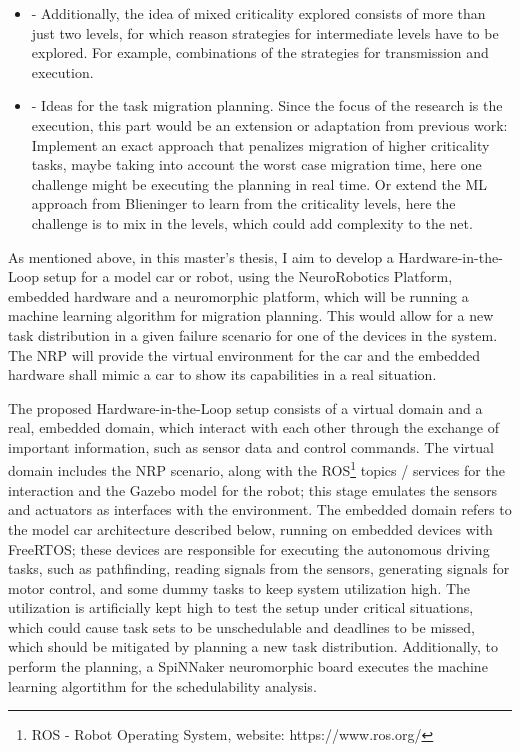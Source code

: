 \begin{itemize}
\item - Additionally, the idea of mixed criticality explored consists of more than just two levels, for which reason strategies for intermediate levels have to be explored. For example, combinations of the strategies for transmission and execution. 
\item - Ideas for the task migration planning. Since the focus of the research is the execution, this part would be an extension or adaptation from previous work: Implement an exact approach that penalizes migration of higher criticality tasks, maybe taking into account the worst case migration time, here one challenge might be executing the planning in real time. Or extend the ML approach from Blieninger to learn from the criticality levels, here the challenge is to mix in the levels, which could add complexity to the net.
\end{itemize}



As mentioned above, in this master’s thesis, I aim to develop a Hardware-in-the-Loop setup for a model car or robot, using the NeuroRobotics Platform, embedded hardware and a neuromorphic platform, which will be running a machine learning algorithm for migration planning. This would allow for a new task distribution in a given failure scenario for one of the devices in the system. The NRP will provide the virtual environment for the car and the embedded hardware shall mimic a car to show its capabilities in a real situation.

The proposed Hardware-in-the-Loop setup consists of a virtual domain and a real, embedded domain, which interact with each other through the exchange of important information, such as sensor data and control commands. The virtual domain includes the NRP scenario, along with the ROS\footnote{ROS - Robot Operating System, website: https://www.ros.org/} topics / services for the interaction and the Gazebo model for the robot; this stage emulates the sensors and actuators as interfaces with the environment. The embedded domain refers to the model car architecture described below, running on embedded devices with FreeRTOS; these devices are responsible for executing the autonomous driving tasks, such as pathfinding, reading signals from the sensors, generating signals for motor control, and some dummy tasks to keep system utilization high. The utilization is artificially kept high to test the setup under critical situations, which could cause task sets to be unschedulable and deadlines to be missed, which should be mitigated by planning a new task distribution. Additionally, to perform the planning, a SpiNNaker neuromorphic board executes the machine learning algortithm for the schedulability analysis.

